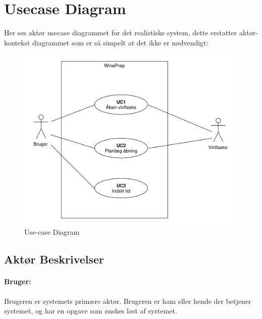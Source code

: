 \section{Usecase Diagram}

Her ses aktør usecase diagrammet for det realistiske system, dette erstatter aktør-kontekst diagrammet som er så simpelt
at det ikke er nødvendigt:
\begin{figure}[H]
\centering
\includegraphics[scale=0.5]{usecasediagram.pdf}
\caption[Figur]{Use-case Diagram}
\end{figure}

\subsection{Aktør Beskrivelser}

\paragraph{Bruger:} Brugeren er systemets primære aktør. Brugeren er ham eller hende der betjener systemet, og har en opgave som ønskes løst af systemet.